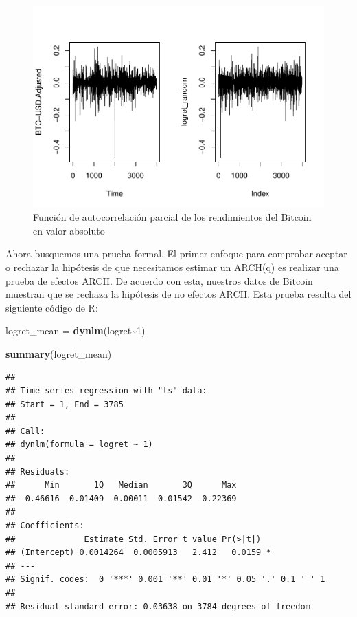 \documentclass[
]{book}
\newenvironment{Shaded}{\begin{snugshade}}{\end{snugshade}}
\newcommand{\DecValTok}[1]{\textcolor[rgb]{0.00,0.00,0.81}{#1}}
\newcommand{\FunctionTok}[1]{\textcolor[rgb]{0.13,0.29,0.53}{\textbf{#1}}}
\newcommand{\NormalTok}[1]{#1}
\newcommand{\OtherTok}[1]{\textcolor[rgb]{0.56,0.35,0.01}{#1}}
\newcommand{\SpecialCharTok}[1]{\textcolor[rgb]{0.81,0.36,0.00}{\textbf{#1}}}
\begin{document}
\begin{figure}

{\centering \includegraphics{Notas-Series-Tiempo_files/figure-latex/fig109-1} 

}

\caption{Función de autocorrelación parcial de los rendimientos del Bitcoin en valor absoluto}\label{fig:fig109}
\end{figure}

Ahora busquemos una prueba formal. El primer enfoque para comprobar aceptar o rechazar la hipótesis de que necesitamos estimar un ARCH(q) es realizar una prueba de efectos ARCH. De acuerdo con esta, nuestros datos de Bitcoin muestran que se rechaza la hipótesis de no efectos ARCH. Esta prueba resulta del siguiente código de R:

\begin{Shaded}
\begin{Highlighting}[]
\NormalTok{logret\_mean }\OtherTok{=} \FunctionTok{dynlm}\NormalTok{(logret}\SpecialCharTok{\textasciitilde{}}\DecValTok{1}\NormalTok{)}

\FunctionTok{summary}\NormalTok{(logret\_mean)}
\end{Highlighting}
\end{Shaded}

\begin{verbatim}
## 
## Time series regression with "ts" data:
## Start = 1, End = 3785
## 
## Call:
## dynlm(formula = logret ~ 1)
## 
## Residuals:
##      Min       1Q   Median       3Q      Max 
## -0.46616 -0.01409 -0.00011  0.01542  0.22369 
## 
## Coefficients:
##              Estimate Std. Error t value Pr(>|t|)  
## (Intercept) 0.0014264  0.0005913   2.412   0.0159 *
## ---
## Signif. codes:  0 '***' 0.001 '**' 0.01 '*' 0.05 '.' 0.1 ' ' 1
## 
## Residual standard error: 0.03638 on 3784 degrees of freedom
\end{verbatim}
\end{document}
